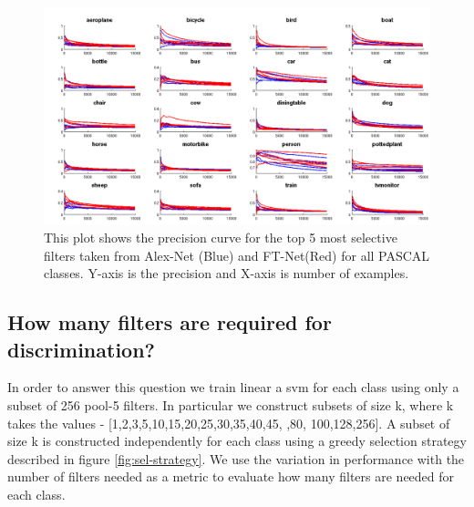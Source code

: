 \documentclass[runningheads]{llncs}
\begin{document}
\begin{figure}[t!]
\centering
\includegraphics[scale=0.20]{images/prob_sel_dims_top5.png}
\caption{This plot shows the precision curve for the top 5 most selective filters taken from Alex-Net (Blue) and FT-Net(Red) for all PASCAL classes. Y-axis is the precision and X-axis is number of examples.}
\label{fig:prob-sel}
\end{figure}

\subsection{How many filters are required for discrimination?}
\label{sub:how-many}
In order to answer this question we train linear a svm for each class using only a subset of 256 pool-5 filters. In particular we construct subsets of size k, where k takes the values - [1,2,3,5,10,15,20,25,30,35,40,45, ,80, 100,128,256]. A subset of size k is constructed independently for each class using a greedy selection strategy described in figure \ref{fig:sel-strategy}. We use the variation in performance with the number of filters needed as a metric to evaluate how many filters are needed for each class. 
  
\end{document}
